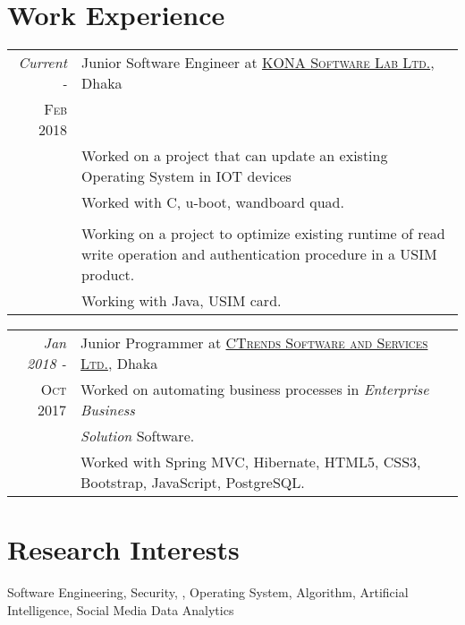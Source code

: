 \documentclass[a4paper,10pt]{article}
\begin{document}
\section{Work Experience}
\begin{tabular}{r|p{11cm}}
 \emph{Current -} & Junior Software Engineer at \href{http://www.konai.com}{\textsc{KONA Software Lab Ltd.}}, Dhaka \\
 \textsc{Feb 2018} & \\
 & Worked on a project that can update an existing Operating System in IOT devices \\ 
 & Worked with C, u-boot, wandboard quad. \\
& \\
& Working on a project to optimize existing runtime of read write \mbox{operation} and authentication procedure in a USIM product. \\
& Working with Java, USIM card.

\end{tabular}


\begin{tabular}{r|p{11cm}}
 \emph{Jan 2018 -} & Junior Programmer at \href{http://www.ctrends-software.com}{\textsc{CTrends Software and Services Ltd.}}, Dhaka \\\textsc{Oct 2017} & Worked on automating business processes in \emph{Enterprise Business} \\ & \emph{Solution} Software.\\
 & Worked with Spring MVC, Hibernate, HTML5, CSS3, Bootstrap, JavaScript, PostgreSQL.
\end{tabular}

\section{Research Interests}
Software Engineering, Security, , Operating System, Algorithm, Artificial Intelligence, Social Media Data Analytics

\end{document}
